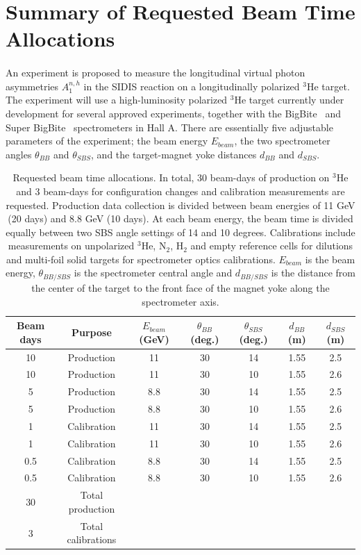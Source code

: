 \section{Summary of Requested Beam Time Allocations}
\paragraph{}
An experiment is proposed to measure the longitudinal virtual photon asymmetries $A_1^{n,h}$ in the SIDIS reaction on a longitudinally polarized $^3$He target. The experiment will use a high-luminosity polarized $^3$He target currently under development for several approved experiments, together with the BigBite~\cite{BigBiteOptics1998,BigBite1998,BigBiteOptics2012} and Super BigBite~\cite{SBS_CDR,SBS_CDR_NEW} spectrometers in Hall A. There are essentially five adjustable parameters of the experiment; the beam energy $E_{beam}$, the two spectrometer angles $\theta_{BB}$ and $\theta_{SBS}$, and the target-magnet yoke distances $d_{BB}$ and $d_{SBS}$.
\begin{table}[h]
  \begin{center}
    \caption{\label{Kintable} Requested beam time allocations. In total, 30 beam-days of production on $^3$He and 3 beam-days for configuration changes and calibration measurements are requested. Production data collection is divided between beam energies of 11 GeV (20 days) and 8.8 GeV (10 days). At each beam energy, the beam time is divided equally between two SBS angle settings of 14 and 10 degrees. Calibrations include measurements on unpolarized $^3$He, N$_2$, H$_2$ and empty reference cells for dilutions and multi-foil solid targets for spectrometer optics calibrations. $E_{beam}$ is the beam energy, $\theta_{BB/SBS}$ is the spectrometer central angle and $d_{BB/SBS}$ is the distance from the center of the target to the front face of the magnet yoke along the spectrometer axis.}
    \begin{tabular}{ccccccc}
      \hline \hline Beam days & Purpose & $E_{beam}$ (GeV) & $\theta_{BB}$ (deg.) & $\theta_{SBS}$ (deg.) & $d_{BB}$ (m) & $d_{SBS}$ (m)  \\ \hline 
      10 & Production & 11 & 30 & 14 & 1.55 & 2.5 \\ 
      10 & Production & 11 & 30 & 10 & 1.55 & 2.6 \\
      5 & Production & 8.8 & 30 & 14 & 1.55 & 2.5  \\ 
      5 & Production & 8.8 & 30 & 10 & 1.55 & 2.6  \\
      1 & Calibration & 11 & 30 & 14 & 1.55 & 2.5  \\
      1 & Calibration & 11 & 30 & 10 & 1.55 & 2.6 \\
      0.5 & Calibration & 8.8 & 30 & 14 & 1.55 & 2.5 \\ 
      0.5 & Calibration & 8.8 & 30 & 10 & 1.55 & 2.6  \\ \hline 
      30 & Total production & & & & &  \\ 
      3 & Total calibrations & & & & &  \\ \hline \hline
    \end{tabular}
  \end{center}
\end{table}
